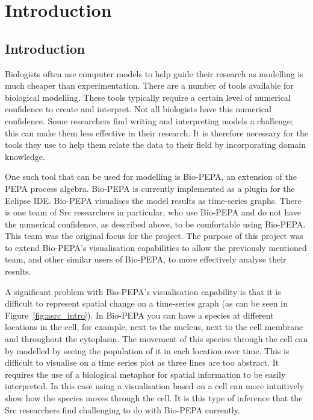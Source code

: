 \chapter{Introduction}
\section{Introduction}

Biologists often use computer models to help guide their research as modelling is much cheaper than experimentation.  There are a number of tools available for biological modelling.  These tools typically require a certain level of numerical confidence to create and interpret.  Not all biologists have this numerical confidence.  Some researchers find writing and interpreting models a challenge; this can make them less effective in their research.  It is therefore necessary for the tools they use to help them relate the data to their field by incorporating domain knowledge.

One such tool that can be used for modelling is Bio-PEPA, an extension of the PEPA process algebra.  Bio-PEPA is currently implemented as a plugin for the Eclipse IDE.  Bio-PEPA visualises the model results as time-series graphs.  There is one team of Src researchers in particular, who use Bio-PEPA and do not have the numerical confidence, as described above, to be comfortable using Bio-PEPA.  This team was the original focus for the project.  The purpose of this project was to extend Bio-PEPA's visualisation capabilities to allow the previously mentioned team, and other similar users of Bio-PEPA, to more effectively analyse their results.

A significant problem with Bio-PEPA's visualisation capability is that it is difficult to represent spatial change on a time-series graph (as can be seen in Figure~\ref{fig:asrc_intro}).  In Bio-PEPA you can have a species at different locations in the cell, for example, next to the nucleus, next to the cell membrane and throughout the cytoplasm.  The movement of this species through the cell can by modelled by seeing the population of it in each location over time.  This is difficult to visualise on a time series plot as three lines are too abstract.  It requires the use of a biological metaphor for spatial information to be easily interpreted.  In this case using a visualisation based on a cell can more intuitively show how the species moves through the cell.  It is this type of inference that the Src researchers find challenging to do with Bio-PEPA currently.

